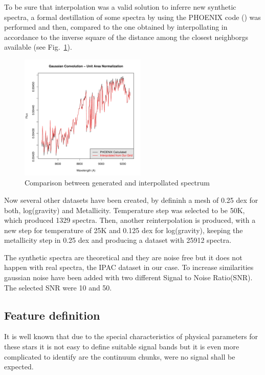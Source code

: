 {
To be sure that interpolation was a valid solution to inferre new synthetic spectra,
a formal destillation of some spectra by using the 
PHOENIX code (\cite{fuhrmeister2005phoenix}) 
was performed and then, compared to the one obtained by interpollating in accordance 
to the inverse square of the distance among the closest neighborgs available 
(see Fig.~\ref{fig:comp_gen_inter}).
}

\begin {figure}
 \begin{center}
 \includegraphics[width=6cm]{figs/intgrid4_gauss.pdf}
 \caption{Comparison between generated and interpollated spectrum}
 \label{fig:comp_gen_inter}
 \end{center}
\end {figure}

{
Now several other datasets have been created, by defininh a mesh of 0.25 dex for 
both, log(gravity) and Metallicity. Temperature step was selected to be 50K, 
which produced 1329 spectra.
Then, another reinterpolation is produced, with a new 
step for temperature of 25K and 0.125 dex for log(gravity), 
keeping the metallicity step in 0.25 dex and producing 
a dataset with 25912 spectra.
}

{
The synthetic spectra are theoretical and they are noise free but it 
does not happen with real spectra, the IPAC dataset in our case.
To increase similarities gaussian noise have been added with two 
different Signal to Noise Ratio(SNR). The selected SNR were 10 and 50.
}

\subsection{Feature definition}
\label{subsec:FD}
{
It is well known that due to the special characteristics of 
physical parameters for these stars it is not easy to define 
suitable signal bands but it is even more complicated to identify 
are the continuum chunks, were no signal shall be expected.
}


